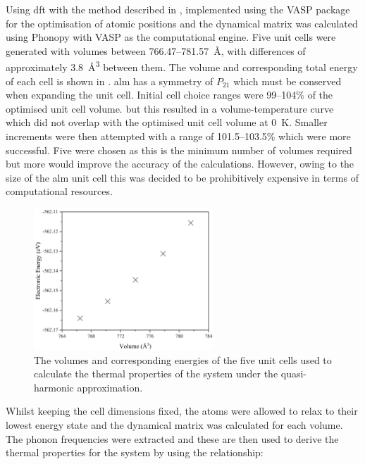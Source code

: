 Using \acrshort{dft} with the method described in , implemented using the VASP package for the optimisation of atomic positions and the dynamical matrix was calculated using Phonopy with VASP as the computational engine. Five unit cells were generated with volumes between 766.47\nobreakdash--\SI{781.57}{\angstrom}, with differences of approximately \SI{3.8}{\angstrom^3} between them.  The volume and corresponding total energy of each cell is shown in . \acrshort{alm} has a symmetry of \(P_{21}\) which must be conserved when expanding the unit cell. Initial cell choice ranges were 99\nobreakdash--104\% of the optimised unit cell volume. but this resulted in a volume\nobreakdash-temperature curve which did not overlap with the optimised unit cell volume at \SI{0}{K}. Smaller increments were then attempted with a range of 101.5\nobreakdash--103.5\% which were more successful. Five were chosen as this is the minimum number of volumes required but more would improve the accuracy of the calculations. However, owing to the size of the \acrshort{alm} unit cell this was decided to be prohibitively expensive in terms of computational resources.

\begin{figure}[h]
\centering
\includegraphics[width=0.6\textwidth]{Figures/Misc/QHA/evG.png}
\captionsetup{font = footnotesize, justification = centering}
\caption[The Selected Volumes and Corresponding Energies used for the Quasi-Harmonic Approximation]{The volumes and corresponding energies of the five unit cells used to calculate the thermal properties of the system under the quasi-harmonic approximation.}
\label{fig:ev}
\end{figure}

Whilst keeping the cell dimensions fixed, the atoms were allowed to relax to their lowest energy state and the dynamical matrix was calculated for each volume. The phonon frequencies were extracted and these are then used to derive the thermal properties for the system by using the relationship:

